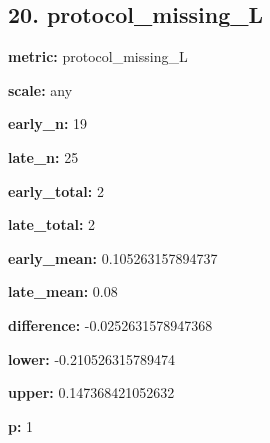 \documentclass[10pt,a4paper]{article}
\begin{document}
\subsection*{20.\allowbreak{} protocol\_\allowbreak{}missing\_\allowbreak{}L}
\textbf{metric:} protocol\_\allowbreak{}missing\_\allowbreak{}L\par
\textbf{scale:} any\par
\textbf{early\_\allowbreak{}n:} 19\par
\textbf{late\_\allowbreak{}n:} 25\par
\textbf{early\_\allowbreak{}total:} 2\par
\textbf{late\_\allowbreak{}total:} 2\par
\textbf{early\_\allowbreak{}mean:} 0.\allowbreak{}105263157894737\par
\textbf{late\_\allowbreak{}mean:} 0.\allowbreak{}08\par
\textbf{difference:} -\allowbreak{}0.\allowbreak{}0252631578947368\par
\textbf{lower:} -\allowbreak{}0.\allowbreak{}210526315789474\par
\textbf{upper:} 0.\allowbreak{}147368421052632\par
\textbf{p:} 1\par
\end{document}
